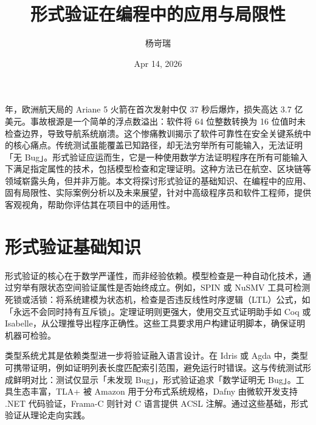 \title{形式验证在编程中的应用与局限性}
\author{杨岢瑞}
\date{Apr 14, 2026}
 年，欧洲航天局的 Ariane 5 火箭在首次发射中仅 37 秒后爆炸，损失高达 3.7 亿美元。事故根源是一个简单的浮点数溢出：软件将 64 位整数转换为 16 位值时未检查边界，导致导航系统崩溃。这个惨痛教训揭示了软件可靠性在安全关键系统中的核心痛点。传统测试虽能覆盖已知路径，却无法穷举所有可能输入，无法证明「无 Bug」。形式验证应运而生，它是一种使用数学方法证明程序在所有可能输入下满足指定属性的技术，包括模型检查和定理证明。这种方法已在航空、区块链等领域崭露头角，但并非万能。本文将探讨形式验证的基础知识、在编程中的应用、固有局限性、实际案例分析以及未来展望，针对中高级程序员和软件工程师，提供客观视角，帮助你评估其在项目中的适用性。\par
\chapter{形式验证基础知识}
形式验证的核心在于数学严谨性，而非经验依赖。模型检查是一种自动化技术，通过穷举有限状态空间验证属性是否始终成立。例如，SPIN 或 NuSMV 工具可检测死锁或活锁：将系统建模为状态机，检查是否违反线性时序逻辑（LTL）公式，如「永远不会同时持有互斥锁」。定理证明则更强大，使用交互式证明助手如 Coq 或 Isabelle，从公理推导出程序正确性。这些工具要求用户构建证明脚本，确保证明机器可检验。\par
类型系统尤其是依赖类型进一步将验证融入语言设计。在 Idris 或 Agda 中，类型可携带证明，例如证明列表长度匹配索引范围，避免运行时错误。这与传统测试形成鲜明对比：测试仅显示「未发现 Bug」，形式验证追求「数学证明无 Bug」。工具生态丰富，TLA+ 被 Amazon 用于分布式系统规格，Dafny 由微软开发支持 .NET 代码验证，Frama-C 则针对 C 语言提供 ACSL 注解。通过这些基础，形式验证从理论走向实践。\par
